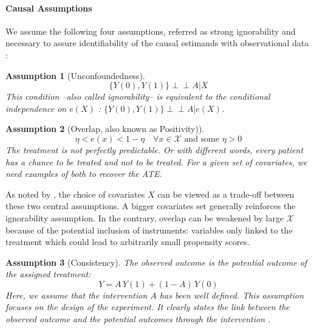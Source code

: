 \documentclass[french,12pt,twoside,a4paper]{book}
\newcommand{\indep}{\perp \!\!\! \perp}
\newtheorem{assumption}{Assumption}
\begin{document}
\begin{background_box_left}


  \paragraph{Causal Assumptions}\label{background:causal_assumptions}

  We assume the following four assumptions, referred as strong ignorability and
  necessary to assure identifiability of the causal estimands with observational
  data \citep{rubin_causal_2005}:
  \begin{assumption}[Unconfoundedness]\label{assumption:ignorability}
    \begin{equation*}\label{eq:ignorability}
      \{Y(0), Y(1) \} \indep A | X
    \end{equation*}
    This condition --also called ignorability-- is equivalent to the conditional
    independence on $e(X)$ \citep{rosenbaum_central_1983}: $\{Y(0), Y(1) \}
      \indep  A | e(X)$.
  \end{assumption}


  \begin{assumption}[Overlap, also known as Positivity)]\label{assumption:overlap}
    \begin{equation*}\label{eq:overlap}
      \eta < e(x) < 1 - \eta \quad \forall x \in \mathcal X \text{ and some } \eta > 0
    \end{equation*}
    The treatment is not perfectly predictable. Or with different words, every
    patient has a chance to be treated and not to be treated. For a given set of
    covariates, we need examples of both to recover the ATE.
  \end{assumption}

  As noted by \cite{damour_overlap_2020}, the choice of covariates $X$ can
  be viewed as a trade-off between these two central assumptions. A bigger
  covariates set generally reinforces the ignorability assumption. In the
  contrary, overlap can be weakened by large $\mathcal{X}$ because of the
  potential inclusion of instruments: variables only linked to the treatment which
  could lead to arbitrarily small propensity scores.


  \begin{assumption}[Consistency]\label{assumption:consistency} The observed
    outcome is the potential outcome of the assigned treatment:
    \begin{equation*}\label{eq:consistancy}
      Y = A \, Y(1) + (1-A) \, Y(0)
    \end{equation*}
    Here, we assume that the intervention $A$ has been well defined. This
    assumption focuses on the design of the experiment. It clearly states the link
    between the observed outcome and the potential outcomes through the
    intervention \citep{hernan_causal_2020}.
  \end{assumption}


\end{background_box_left}
\end{document}
